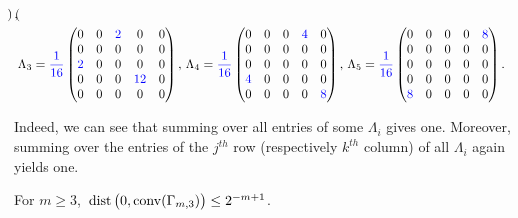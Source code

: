\begin{example}
{\begin{align*}
\begin{pmatrix}
		\end{pmatrix},\\
		&\Lambda_3 = {\color{blue}\frac{1}{16}} \begin{pmatrix}
			0 & 0 & {\color{blue}2} & 0 & 0 \\ 0 & 0 & 0 & 0 & 0 \\ {\color{blue}2} & 0 & 0 & 0 & 0 \\ 0 & 0 & 0 & {\color{blue}12} & 0 \\ 0 & 0 & 0 & 0 & 0
		\end{pmatrix}, \,
		\Lambda_4 = {\color{blue}\frac{1}{16}} \begin{pmatrix}
			0 & 0 & 0 & {\color{blue}4} & 0 \\ 0 & 0 & 0 & 0 & 0 \\ 0 & 0 & 0 & 0 & 0 \\ {\color{blue}4} & 0 & 0 & 0 & 0 \\ 0 & 0 & 0 & 0 & {\color{blue}8}
		\end{pmatrix},\,
		\Lambda_5 = {\color{blue}\frac{1}{16}} \begin{pmatrix}
			0 & 0 & 0 & 0 & {\color{blue}8} \\ 0 & 0 & 0 & 0 & 0 \\ 0 & 0 & 0 & 0 & 0 \\ 0 & 0 & 0 & 0 & 0 \\ {\color{blue}8} & 0 & 0 & 0 & 0
		\end{pmatrix}.
	\end{align*}}

	Indeed, we can see that summing over all entries of some $\Lambda_i$ gives one. Moreover, summing over the entries of the $j^{th}$ row (respectively $k^{th}$ column) of all $\Lambda_{i}$ again yields one.
	\hfill\exSymbol
\end{example}


\begin{lemma} \label{lem:distKravtsov}
	For $m \geq 3$, $\, \operatorname{dist}\big( 0, \operatorname{conv}(\Gamma_{m,3}) \big) \leq 2^{-m+1}$.
\end{lemma}

